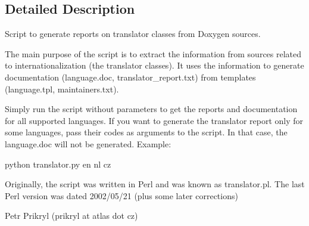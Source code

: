 \subsection{Detailed Description}
\begin{DoxyVerb}Script to generate reports on translator classes from Doxygen sources.

  The main purpose of the script is to extract the information from sources
  related to internationalization (the translator classes). It uses the
  information to generate documentation (language.doc,
  translator_report.txt) from templates (language.tpl, maintainers.txt).

  Simply run the script without parameters to get the reports and
  documentation for all supported languages. If you want to generate the
  translator report only for some languages, pass their codes as arguments
  to the script. In that case, the language.doc will not be generated.
  Example:

    python translator.py en nl cz

  Originally, the script was written in Perl and was known as translator.pl.
  The last Perl version was dated 2002/05/21 (plus some later corrections)

                             Petr Prikryl (prikryl at atlas dot cz)


\end{DoxyVerb}
